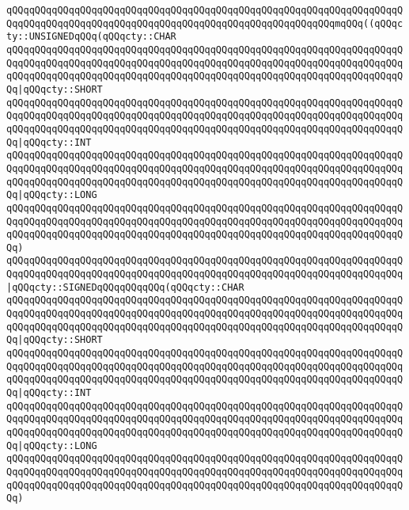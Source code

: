 \verb|qQQqqQQqqQQqqQQqqQQqqQQqqQQqqQQqqQQqqQQqqQQqqQQqqQQqqQQqqQQqqQQqqQQqqQQqqQQqqQQqqQQqqQQqqQQqqQQqqQQqqQQqqQQqqQQqqQQqqQQqqQQqqQQqmqQQq((qQQqcty::UNSIGNEDqQQq(qQQqcty::CHAR|\newline
\verb|qQQqqQQqqQQqqQQqqQQqqQQqqQQqqQQqqQQqqQQqqQQqqQQqqQQqqQQqqQQqqQQqqQQqqQQqqQQqqQQqqQQqqQQqqQQqqQQqqQQqqQQqqQQqqQQqqQQqqQQqqQQqqQQqqQQqqQQqqQQqqQQqqQQqqQQqqQQqqQQqqQQqqQQqqQQqqQQqqQQqqQQqqQQqqQQqqQQqqQQqqQQqqQQqqQQq|\verb#|qQQqcty::SHORT#\newline
\verb|qQQqqQQqqQQqqQQqqQQqqQQqqQQqqQQqqQQqqQQqqQQqqQQqqQQqqQQqqQQqqQQqqQQqqQQqqQQqqQQqqQQqqQQqqQQqqQQqqQQqqQQqqQQqqQQqqQQqqQQqqQQqqQQqqQQqqQQqqQQqqQQqqQQqqQQqqQQqqQQqqQQqqQQqqQQqqQQqqQQqqQQqqQQqqQQqqQQqqQQqqQQqqQQqqQQq|\verb#|qQQqcty::INT#\newline
\verb|qQQqqQQqqQQqqQQqqQQqqQQqqQQqqQQqqQQqqQQqqQQqqQQqqQQqqQQqqQQqqQQqqQQqqQQqqQQqqQQqqQQqqQQqqQQqqQQqqQQqqQQqqQQqqQQqqQQqqQQqqQQqqQQqqQQqqQQqqQQqqQQqqQQqqQQqqQQqqQQqqQQqqQQqqQQqqQQqqQQqqQQqqQQqqQQqqQQqqQQqqQQqqQQqqQQq|\verb#|qQQqcty::LONG#\newline
\verb|qQQqqQQqqQQqqQQqqQQqqQQqqQQqqQQqqQQqqQQqqQQqqQQqqQQqqQQqqQQqqQQqqQQqqQQqqQQqqQQqqQQqqQQqqQQqqQQqqQQqqQQqqQQqqQQqqQQqqQQqqQQqqQQqqQQqqQQqqQQqqQQqqQQqqQQqqQQqqQQqqQQqqQQqqQQqqQQqqQQqqQQqqQQqqQQqqQQqqQQqqQQqqQQqqQQq)|\newline
\verb|qQQqqQQqqQQqqQQqqQQqqQQqqQQqqQQqqQQqqQQqqQQqqQQqqQQqqQQqqQQqqQQqqQQqqQQqqQQqqQQqqQQqqQQqqQQqqQQqqQQqqQQqqQQqqQQqqQQqqQQqqQQqqQQqqQQqqQQqqQQq|\verb#|qQQqcty::SIGNEDqQQqqQQqqQQq(qQQqcty::CHAR#\newline
\verb|qQQqqQQqqQQqqQQqqQQqqQQqqQQqqQQqqQQqqQQqqQQqqQQqqQQqqQQqqQQqqQQqqQQqqQQqqQQqqQQqqQQqqQQqqQQqqQQqqQQqqQQqqQQqqQQqqQQqqQQqqQQqqQQqqQQqqQQqqQQqqQQqqQQqqQQqqQQqqQQqqQQqqQQqqQQqqQQqqQQqqQQqqQQqqQQqqQQqqQQqqQQqqQQqqQQq|\verb#|qQQqcty::SHORT#\newline
\verb|qQQqqQQqqQQqqQQqqQQqqQQqqQQqqQQqqQQqqQQqqQQqqQQqqQQqqQQqqQQqqQQqqQQqqQQqqQQqqQQqqQQqqQQqqQQqqQQqqQQqqQQqqQQqqQQqqQQqqQQqqQQqqQQqqQQqqQQqqQQqqQQqqQQqqQQqqQQqqQQqqQQqqQQqqQQqqQQqqQQqqQQqqQQqqQQqqQQqqQQqqQQqqQQqqQQq|\verb#|qQQqcty::INT#\newline
\verb|qQQqqQQqqQQqqQQqqQQqqQQqqQQqqQQqqQQqqQQqqQQqqQQqqQQqqQQqqQQqqQQqqQQqqQQqqQQqqQQqqQQqqQQqqQQqqQQqqQQqqQQqqQQqqQQqqQQqqQQqqQQqqQQqqQQqqQQqqQQqqQQqqQQqqQQqqQQqqQQqqQQqqQQqqQQqqQQqqQQqqQQqqQQqqQQqqQQqqQQqqQQqqQQqqQQq|\verb#|qQQqcty::LONG#\newline
\verb|qQQqqQQqqQQqqQQqqQQqqQQqqQQqqQQqqQQqqQQqqQQqqQQqqQQqqQQqqQQqqQQqqQQqqQQqqQQqqQQqqQQqqQQqqQQqqQQqqQQqqQQqqQQqqQQqqQQqqQQqqQQqqQQqqQQqqQQqqQQqqQQqqQQqqQQqqQQqqQQqqQQqqQQqqQQqqQQqqQQqqQQqqQQqqQQqqQQqqQQqqQQqqQQqqQQq)|\newline

